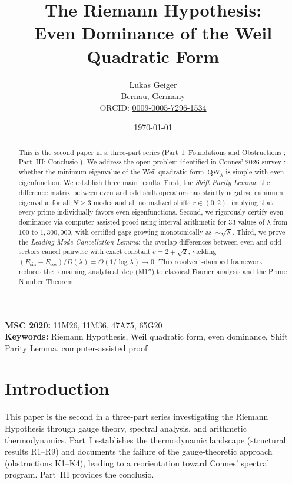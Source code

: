 \documentclass[12pt,a4paper]{article}
\title{The Riemann Hypothesis:\\ Even Dominance of the Weil Quadratic Form}
\author{Lukas Geiger\\
\small Bernau, Germany\\
\small ORCID: \href{https://orcid.org/0009-0005-7296-1534}{0009-0005-7296-1534}}
\date{\today}
\theoremstyle{definition}
\theoremstyle{remark}
\begin{document}
\overfullrule=0pt
\maketitle

\begin{abstract}
This is the second paper in a three-part series (Part~I: Foundations and Obstructions \cite{Geiger2026partI}; Part~III: Conclusio \cite{Geiger2026partIII}). We address the open problem identified in Connes' 2026 survey \cite{Connes2026}: whether the minimum eigenvalue of the Weil quadratic form~$\mathrm{QW}_\lambda$ is simple with even eigenfunction. We establish three main results. First, the \emph{Shift Parity Lemma}: the difference matrix between even and odd shift operators has strictly negative minimum eigenvalue for all $N \geq 3$ modes and all normalized shifts $r \in (0,2)$, implying that every prime individually favors even eigenfunctions. Second, we rigorously certify even dominance via computer-assisted proof using interval arithmetic for $33$ values of $\lambda$ from $100$ to $1{,}300{,}000$, with certified gaps growing monotonically as~$\sim\!\sqrt{\lambda}$. Third, we prove the \emph{Leading-Mode Cancellation Lemma}: the overlap differences between even and odd sectors cancel pairwise with exact constant $c = 2 + \sqrt{2}$, yielding $(E_{\sin} - E_{\cos})/D(\lambda) = O(1/\log\lambda) \to 0$. This resolvent-damped framework reduces the remaining analytical step (M1$''$) to classical Fourier analysis and the Prime Number Theorem.
\end{abstract}

\noindent\textbf{MSC 2020:} 11M26, 11M36, 47A75, 65G20\\
\textbf{Keywords:} Riemann Hypothesis, Weil quadratic form, even dominance, Shift Parity Lemma, computer-assisted proof

\newpage
\tableofcontents
\newpage

\section{Introduction}
\label{sec:intro}

This paper is the second in a three-part series investigating the Riemann Hypothesis through gauge theory, spectral analysis, and arithmetic thermodynamics. Part~I \cite{Geiger2026partI} establishes the thermodynamic landscape (structural results R1--R9) and documents the failure of the gauge-theoretic approach (obstructions K1--K4), leading to a reorientation toward Connes' spectral program. Part~III \cite{Geiger2026partIII} provides the conclusio.
\end{document}
